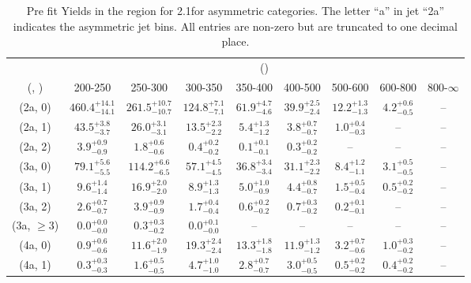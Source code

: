 \begin{table}[h!]
\tiny
\centering
\caption{Pre fit Yields in the \mmj region for 2.1\ifb for asymmetric categories. The letter ``a'' in jet \eg ``2a''  indicates the asymmetric jet bins. All entries are non-zero but are truncated to one decimal place.\label{tab:prednodatanaive_mumu_comb_asym}}
\begin{tabular}
{ccccccccc}
	\hline\hline
	& \multicolumn{8}{c}{\scalht (\gev)} \\ 
	 (\njet,  \nb) & 200-250 & 250-300 & 300-350 & 350-400 & 400-500 & 500-600 & 600-800 & 800-$\infty$ \\ [0.8ex] 
\hline
	(2a, 0) & $460.4^{+ 14.1 }_{- 14.1 }$ & $261.5^{+ 10.7 }_{- 10.7 }$ & $124.8^{+ 7.1 }_{- 7.1 }$ & $61.9^{+ 4.7 }_{- 4.6 }$ & $39.9^{+ 2.5 }_{- 2.4 }$ & $12.2^{+ 1.3 }_{- 1.3 }$ & $4.2^{+ 0.6 }_{- 0.5 }$ & -- \\[0.5ex] 
	(2a, 1) & $43.5^{+ 3.8 }_{- 3.7 }$ & $26.0^{+ 3.1 }_{- 3.1 }$ & $13.5^{+ 2.3 }_{- 2.2 }$ & $5.4^{+ 1.3 }_{- 1.2 }$ & $3.8^{+ 0.7 }_{- 0.7 }$ & $1.0^{+ 0.4 }_{- 0.3 }$ & -- & -- \\[0.5ex] 
	(2a, 2) & $3.9^{+ 0.9 }_{- 0.9 }$ & $1.8^{+ 0.6 }_{- 0.6 }$ & $0.4^{+ 0.2 }_{- 0.2 }$ & $0.1^{+ 0.1 }_{- 0.1 }$ & $0.3^{+ 0.2 }_{- 0.2 }$ & -- & -- & -- \\[0.5ex] 
	(3a, 0) & $79.1^{+ 5.6 }_{- 5.5 }$ & $114.2^{+ 6.6 }_{- 6.5 }$ & $57.1^{+ 4.5 }_{- 4.5 }$ & $36.8^{+ 3.4 }_{- 3.4 }$ & $31.1^{+ 2.3 }_{- 2.2 }$ & $8.4^{+ 1.2 }_{- 1.1 }$ & $3.1^{+ 0.5 }_{- 0.5 }$ & -- \\[0.5ex] 
	(3a, 1) & $9.6^{+ 1.4 }_{- 1.4 }$ & $16.9^{+ 2.0 }_{- 2.0 }$ & $8.9^{+ 1.3 }_{- 1.3 }$ & $5.0^{+ 1.0 }_{- 0.9 }$ & $4.4^{+ 0.8 }_{- 0.7 }$ & $1.5^{+ 0.5 }_{- 0.4 }$ & $0.5^{+ 0.2 }_{- 0.2 }$ & -- \\[0.5ex] 
	(3a, 2) & $2.6^{+ 0.7 }_{- 0.7 }$ & $3.9^{+ 0.9 }_{- 0.9 }$ & $1.7^{+ 0.4 }_{- 0.4 }$ & $0.6^{+ 0.2 }_{- 0.2 }$ & $0.7^{+ 0.3 }_{- 0.2 }$ & $0.2^{+ 0.1 }_{- 0.1 }$ & -- & -- \\[0.5ex] 
	(3a, $\ge3$) & $0.0^{+ 0.0 }_{- 0.0 }$ & $0.3^{+ 0.3 }_{- 0.2 }$ & $0.0^{+ 0.1 }_{- 0.0 }$ & -- & -- & -- & -- & -- \\[0.5ex] 
	(4a, 0) & $0.9^{+ 0.6 }_{- 0.6 }$ & $11.6^{+ 2.0 }_{- 1.9 }$ & $19.3^{+ 2.4 }_{- 2.4 }$ & $13.3^{+ 1.8 }_{- 1.8 }$ & $11.9^{+ 1.3 }_{- 1.2 }$ & $3.2^{+ 0.7 }_{- 0.6 }$ & $1.0^{+ 0.3 }_{- 0.2 }$ & -- \\[0.5ex] 
	(4a, 1) & $0.3^{+ 0.3 }_{- 0.3 }$ & $1.6^{+ 0.5 }_{- 0.5 }$ & $4.7^{+ 1.0 }_{- 1.0 }$ & $2.8^{+ 0.7 }_{- 0.7 }$ & $3.0^{+ 0.5 }_{- 0.5 }$ & $0.5^{+ 0.2 }_{- 0.2 }$ & $0.4^{+ 0.2 }_{- 0.2 }$ & -- \\[0.5ex] 

\end{tabular}
\end{table}
